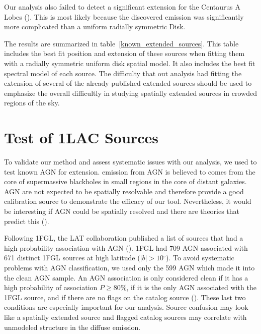 \documentclass[12pt,preprint]{aastex}
\newcommand{\gev}{\text{GeV}\xspace}
\renewcommand{\deg}{\ensuremath{^\circ}\xspace}
\newcommand{\pointlike}{\text{\em pointlike}\xspace}
\begin{document}

Our analysis also failed to detect a significant extension for the
Centaurus A Lobes (\cite{cen_a_lat}). This is most likely because the
discovered emission was significantly more complicated than a uniform
radially symmetric Disk.  

The results are summarized in table~\ref{known_extended_sources}.
This table includes the best fit position and extension of these
sources when fitting them with a radially symmetric uniform disk spatial
model.  It also includes the best fit spectral model of each source.
The difficulty that out analysis had fitting the extension of several
of the already published extended sources should be used to emphasize
the overall difficultly in studying spatially extended sources in crowded
regions of the sky.

\section{Test of 1LAC Sources}
\label{test_1lac_sources}

To validate our method and assess systematic issues with our analysis,
we used \pointlike to test known AGN for extension.
\gev emission from AGN is believed to comes from the core of supermassive
blackholes in small regions in the core of distant galaxies.  AGN are
not expected to be spatially resolvable and therefore provide a good
calibration source to demonstrate the efficacy of our tool. Nevertheless,
it would be interesting if AGN could be spatially resolved and
there are theories that predict this (\cite{pair_halo_paper}).

Following 1FGL, the LAT collaboration published
a list of sources that had a high probability association with
AGN (\cite{first_agn_cat}).
1FGL had 709 AGN associated with 671 distinct
1FGL sources at high latitude ($|b|>10\deg$).  To avoid systematic
problems with AGN classification, we used only the 599 AGN which made
it into the clean AGN sample.  An AGN association is only considered
clean if it has a high probability of association $P\ge 80\%$, if it is
the only AGN associated with the 1FGL source, and if there are no flags
on the catalog source (\cite{first_cat}). These last two conditions are
especially important for our analysis.  Source confusion may look like
a spatially extended source and flagged catalog sources may correlate
with unmodeled structure in the diffuse emission.
\end{document}
